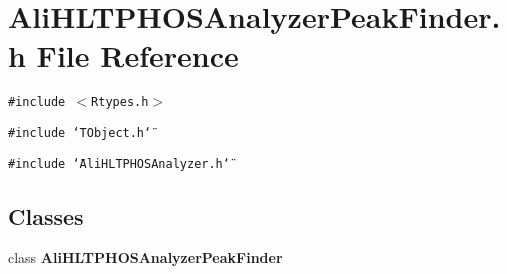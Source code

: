 \section{Ali\-HLTPHOSAnalyzer\-Peak\-Finder.h File Reference}
\label{AliHLTPHOSAnalyzerPeakFinder_8h}
{\tt \#include $<$Rtypes.h$>$}\par
{\tt \#include \char`\"{}TObject.h\char`\"{}}\par
{\tt \#include \char`\"{}Ali\-HLTPHOSAnalyzer.h\char`\"{}}\par
\subsection*{Classes}
\begin{CompactItemize}
\item 
class {\bf Ali\-HLTPHOSAnalyzer\-Peak\-Finder}
\end{CompactItemize}
